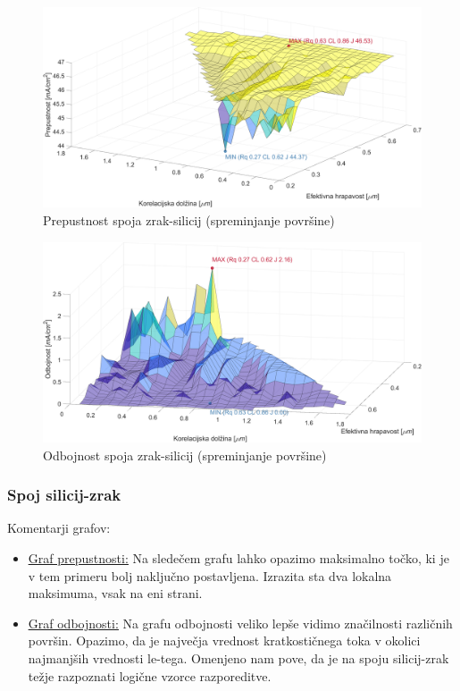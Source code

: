 \documentclass[a4paper,twoside,openright,12pt,slovene]{book}
\begin{document}
\begin{figure}[H]
    \centering
    \includegraphics[width=150mm]{Slike/pre_air_Si.png}
    \caption{Prepustnost spoja zrak-silicij (spreminjanje površine)}
    \label{fig:pre_air_si_v}
\end{figure}

\begin{figure}[H]
    \centering
    \includegraphics[width=150mm]{Slike/odb_air_Si.png}
    \caption{Odbojnost spoja zrak-silicij (spreminjanje površine)}
    \label{fig:odb_air_si_v}
\end{figure}

\subsubsection{Spoj silicij-zrak}

Komentarji grafov:

\begin{itemize}
    \item \underline{\hyperref[fig:pre_si_air_v]{Graf prepustnosti:}} Na sledečem grafu lahko opazimo maksimalno točko, ki je v tem primeru bolj naključno postavljena. Izrazita sta dva lokalna maksimuma, vsak na eni strani.

    \item \underline{\hyperref[fig:odb_si_air_v]{Graf odbojnosti:}} Na grafu odbojnosti veliko lepše vidimo značilnosti različnih površin. Opazimo, da je največja vrednost kratkostičnega toka v okolici najmanjših vrednosti le-tega. Omenjeno nam pove, da je na spoju silicij-zrak težje razpoznati logične vzorce razporeditve.
\end{itemize}
\end{document}

